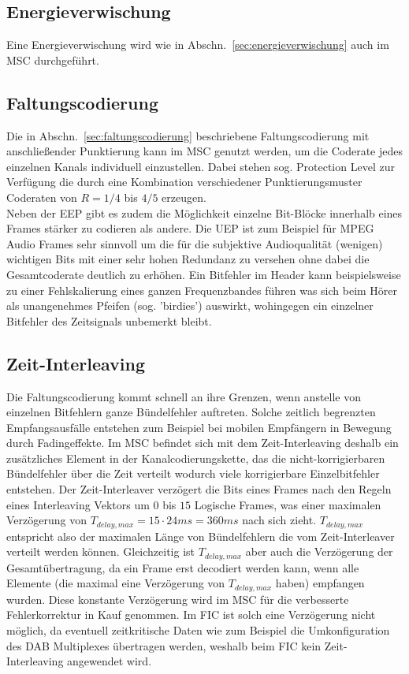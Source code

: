 \subsection{Energieverwischung}
Eine Energieverwischung wird wie in Abschn.~\ref{sec:energieverwischung} auch im \ac{MSC} durchgeführt.

\subsection{Faltungscodierung}
Die in Abschn.~\ref{sec:faltungscodierung} beschriebene Faltungscodierung mit anschließender Punktierung kann im \ac{MSC} genutzt werden, um die Coderate jedes einzelnen Kanals individuell einzustellen. Dabei stehen sog. Protection Level zur Verfügung die durch eine Kombination verschiedener Punktierungsmuster Coderaten von $R=1/4$ bis $4/5$ erzeugen.\\
Neben der \ac{EEP} gibt es zudem die Möglichkeit einzelne Bit-Blöcke innerhalb eines Frames stärker zu codieren als andere. Die \ac{UEP} ist zum Beispiel für MPEG Audio Frames sehr sinnvoll um die für die subjektive Audioqualität (wenigen) wichtigen Bits mit einer sehr hohen Redundanz zu versehen ohne dabei die Gesamtcoderate deutlich zu erhöhen. Ein Bitfehler im Header kann beispielsweise zu einer Fehlskalierung eines ganzen Frequenzbandes führen was sich beim Hörer als unangenehmes Pfeifen (sog. 'birdies') auswirkt, wohingegen ein einzelner Bitfehler des Zeitsignals unbemerkt bleibt.

\subsection{Zeit-Interleaving}
Die Faltungscodierung kommt schnell an ihre Grenzen, wenn anstelle von einzelnen Bitfehlern ganze Bündelfehler auftreten. Solche zeitlich begrenzten Empfangsausfälle entstehen zum Beispiel bei mobilen Empfängern in Bewegung durch Fadingeffekte. Im \ac{MSC} befindet sich mit dem Zeit-Interleaving deshalb ein zusätzliches Element in der Kanalcodierungskette, das die nicht-korrigierbaren Bündelfehler über die Zeit verteilt wodurch viele korrigierbare Einzelbitfehler entstehen. Der Zeit-Interleaver verzögert die Bits eines Frames nach den Regeln eines Interleaving Vektors um $0$ bis $15$ Logische Frames, was einer maximalen Verzögerung von $T_{delay, max} = 15 \cdot 24ms = 360 ms$ nach sich zieht. $T_{delay, max}$ entspricht also der maximalen Länge von Bündelfehlern die vom Zeit-Interleaver verteilt werden können.  Gleichzeitig ist $T_{delay, max}$ aber auch die Verzögerung der Gesamtübertragung, da ein Frame erst decodiert werden kann, wenn alle Elemente (die maximal eine Verzögerung von $T_{delay, max}$ haben) empfangen wurden. Diese konstante Verzögerung wird im MSC für die verbesserte Fehlerkorrektur in Kauf genommen. Im FIC ist solch eine Verzögerung nicht möglich, da eventuell zeitkritische Daten wie zum Beispiel die Umkonfiguration des DAB Multiplexes übertragen werden, weshalb beim FIC kein Zeit-Interleaving angewendet wird.

